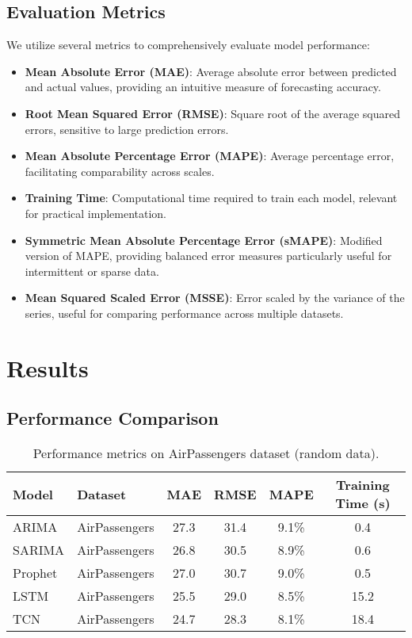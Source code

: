 \documentclass{article}
\begin{document}
\subsection{Evaluation Metrics}
We utilize several metrics to comprehensively evaluate model performance:
\begin{itemize}
    \item \textbf{Mean Absolute Error (MAE)}: Average absolute error between predicted and actual values, providing an intuitive measure of forecasting accuracy.
    \item \textbf{Root Mean Squared Error (RMSE)}: Square root of the average squared errors, sensitive to large prediction errors.
    \item \textbf{Mean Absolute Percentage Error (MAPE)}: Average percentage error, facilitating comparability across scales.
    \item \textbf{Training Time}: Computational time required to train each model, relevant for practical implementation.
    \item \textbf{Symmetric Mean Absolute Percentage Error (sMAPE)}: Modified version of MAPE, providing balanced error measures particularly useful for intermittent or sparse data.
    \item \textbf{Mean Squared Scaled Error (MSSE)}: Error scaled by the variance of the series, useful for comparing performance across multiple datasets.
\end{itemize}

\section{Results}

\subsection{Performance Comparison}
\begin{table}[h]
    \centering
    \begin{tabular}{llcccc}
    \toprule
        Model & Dataset & MAE & RMSE & MAPE & Training Time (s)\\
    \midrule
        ARIMA & AirPassengers & 27.3 & 31.4 & 9.1\% & 0.4 \\
        SARIMA & AirPassengers & 26.8 & 30.5 & 8.9\% & 0.6 \\
        Prophet & AirPassengers & 27.0 & 30.7 & 9.0\% & 0.5 \\
        LSTM & AirPassengers & 25.5 & 29.0 & 8.5\% & 15.2 \\
        TCN & AirPassengers & 24.7 & 28.3 & 8.1\% & 18.4 \\
    \bottomrule
    \end{tabular}
    \caption{Performance metrics on AirPassengers dataset (random data).}
\end{table}
\end{document}
